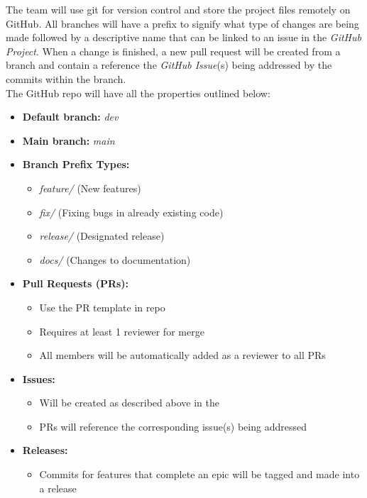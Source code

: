 \documentclass{article}
\begin{document}
The team will use git for version control and store the project files remotely on GitHub. All branches will have a prefix to signify what type of changes are being made followed by a descriptive name that can be linked to an issue in the \textit{GitHub Project}. When a change is finished, a new pull request will be created from a branch and contain a reference the \textit{GitHub Issue}(s) being addressed by the commits within the branch.\\

The GitHub repo will have all the properties outlined below:
\begin{itemize}
    \item \textbf{Default branch:} \textit{dev}
    \item \textbf{Main branch:} \textit{main}
    \item \textbf{Branch Prefix Types:}
    \begin{itemize}
        \item \textit{feature/} (New features)
        \item \textit{fix/} (Fixing bugs in already existing code)
        \item \textit{release/} (Designated release)
        \item \textit{docs/} (Changes to documentation)
    \end{itemize}
    \item \textbf{Pull Requests (PRs):}
    \begin{itemize}
        \item Use the PR template in repo
        \item Requires at least 1 reviewer for merge
        \item All members will be automatically added as a reviewer to all PRs
    \end{itemize}
    \item \textbf{Issues:}
    \begin{itemize}
        \item Will be created as described above in the 
        \item PRs will reference the corresponding issue(s) being addressed
    \end{itemize}
    \item \textbf{Releases:}
    \begin{itemize}
        \item Commits for features that complete an epic will be tagged and made into a release
    \end{itemize}
\end{itemize}
\end{document}
